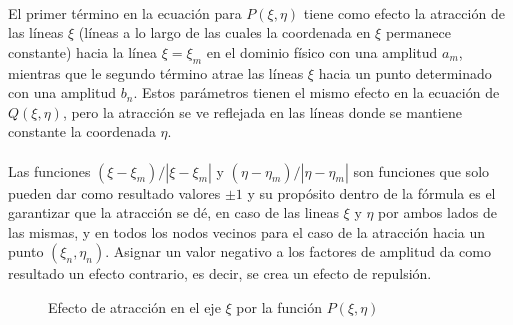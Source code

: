 \documentclass[letterpaper, openright, 12pt]{book}
\begin{document}
			\paragraph*{}
				El primer término en la ecuación para $P(\xi, \eta)$ tiene como efecto la atracción de las líneas $\xi$ (líneas a lo largo de las cuales la coordenada en $\xi$ permanece constante) hacia la línea $\xi = \xi_{m}$ en el dominio físico con una amplitud $a_{m}$, mientras que le segundo término atrae las líneas $\xi$ hacia un punto determinado con una amplitud $b_{n}$. Estos parámetros tienen el mismo efecto en la ecuación de $Q(\xi, \eta)$, pero la atracción se ve reflejada en las líneas donde se mantiene constante la coordenada $\eta$.
			\paragraph*{}
				Las funciones $(\xi - \xi_{m}) / |\xi - \xi_{m}|$ y $(\eta - \eta_{m}) / |\eta - \eta_{m}|$ son funciones que solo pueden dar como resultado valores $\pm 1$ y su propósito dentro de la fórmula es el garantizar que la atracción se dé, en caso de las lineas $\xi$ y $\eta$ por ambos lados de las mismas, y en todos los nodos vecinos para el caso de la atracción hacia un punto $(\xi_{n}, \eta_{n})$. Asignar un valor negativo a los factores de amplitud da como resultado un efecto contrario, es decir, se crea un efecto de repulsión.
				\begin{figure}[htbp!]
					\centering
					\hspace{1cm}
					\caption[Efecto de atracción por función $P(\xi,\eta)$]{Efecto de atracción en el eje $\xi$ por la función $P(\xi, \eta)$}
					\label{fig:densidad-xi}
				\end{figure}
			
\end{document}
